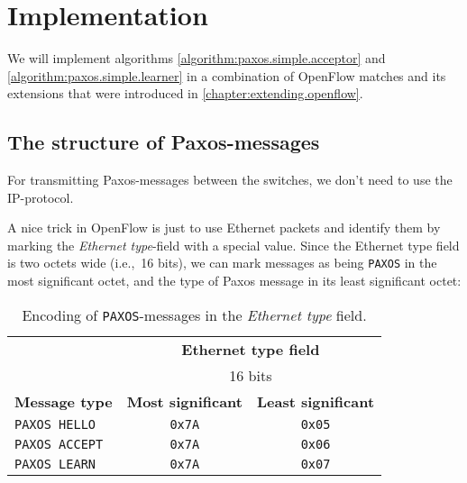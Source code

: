 \chapter{Implementation}
\label{chapter:implementation}
\label{implementation.simplified.paxos}

We will implement algorithms \ref{algorithm:paxos.simple.acceptor} 
and \ref{algorithm:paxos.simple.learner} in a combination of OpenFlow
matches and its extensions that were introduced
in \vref{chapter:extending.openflow}.



\section{The structure of Paxos-messages}

For transmitting Paxos-messages between the switches, we don't need to use
the IP-protocol.

A nice trick in OpenFlow is just to use Ethernet packets
and identify them by marking the \textit{Ethernet
  type}-field with a special value.
Since the Ethernet type field is two octets wide (i.e.,~16 bits), we can
mark messages as being \texttt{PAXOS} in the most significant octet, and the
type of Paxos message in its least significant octet:

\begin{table}[H]
  \centering
  \begin{tabular}{l|c|c|}
    \cline{2-3}
      & \multicolumn{2}{c|}{\textbf{Ethernet type field}} \\
      & \multicolumn{2}{c|}{16 bits} \\

    \hline
      \multicolumn{1}{|l|}{\textbf{Message type}} &
      \textbf{Most significant} &
      \textbf{Least significant} \\

    \hline
      \multicolumn{1}{|l|}{\texttt{PAXOS HELLO}} &
      \texttt{0x7A} &
      \texttt{0x05} \\

    \hline
      \multicolumn{1}{|l|}{\texttt{PAXOS ACCEPT}} &
      \texttt{0x7A} &
      \texttt{0x06} \\

    \hline
      \multicolumn{1}{|l|}{\texttt{PAXOS LEARN}} &
      \texttt{0x7A} &
      \texttt{0x07} \\

    \hline
  \end{tabular}
  \caption{Encoding of \texttt{PAXOS}-messages in the \textit{Ethernet
    type} field.}
  \label{table:paxos.ethernet.type.encoding}
\end{table}

